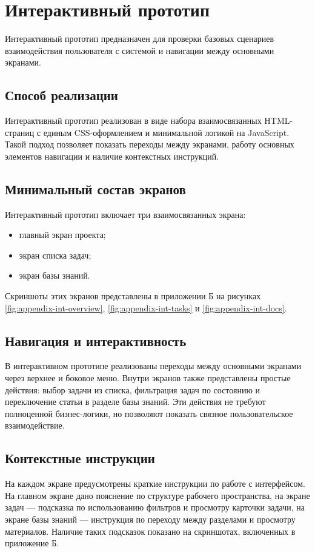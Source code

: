 \section{Интерактивный прототип}
\headingtextsep

Интерактивный прототип предназначен для проверки базовых сценариев взаимодействия пользователя с системой и навигации между основными экранами.

\textheadingsep
\subsection{Способ реализации}
\headingtextsep

Интерактивный прототип реализован в виде набора взаимосвязанных HTML-страниц с единым CSS-оформлением и минимальной логикой на JavaScript. Такой подход позволяет показать переходы между экранами, работу основных элементов навигации и наличие контекстных инструкций.

\textheadingsep
\subsection{Минимальный состав экранов}
\headingtextsep

Интерактивный прототип включает три взаимосвязанных экрана:

\begin{itemize}
\item главный экран проекта;
\item экран списка задач;
\item экран базы знаний.
\end{itemize}

Скриншоты этих экранов представлены в приложении Б на рисунках \ref{fig:appendix-int-overview}, \ref{fig:appendix-int-tasks} и \ref{fig:appendix-int-docs}.

\textheadingsep
\subsection{Навигация и интерактивность}
\headingtextsep

В интерактивном прототипе реализованы переходы между основными экранами через верхнее и боковое меню. Внутри экранов также представлены простые действия: выбор задачи из списка, фильтрация задач по состоянию и переключение статьи в разделе базы знаний. Эти действия не требуют полноценной бизнес-логики, но позволяют показать связное пользовательское взаимодействие.

\textheadingsep
\subsection{Контекстные инструкции}
\headingtextsep

На каждом экране предусмотрены краткие инструкции по работе с интерфейсом. На главном экране дано пояснение по структуре рабочего пространства, на экране задач --- подсказка по использованию фильтров и просмотру карточки задачи, на экране базы знаний --- инструкция по переходу между разделами и просмотру материалов. Наличие таких подсказок показано на скриншотах, включенных в приложение Б.